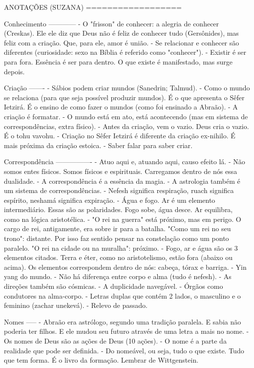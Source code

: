 ANOTAÇÕES (SUZANA)
==================

Conhecimento
------------
- O "frisson" de conhecer: a alegria de conhecer (Creskas). Ele ele diz que Deus não é feliz de conhecer tudo (Gersônides), mas feliz com a criação. Que, para ele, amor é união. 
- Se relacionar e conhecer são diferentes (curiosidade: sexo na Bíblia é referido como "conhecer").
- Existir é ser para fora. Essência é ser para dentro. O que existe é manifestado, mas surge depois.

Criação
-------
- Sábios podem criar mundos (Sanedrin; Talmud).
- Como o mundo se relaciona (para que seja possível produzir mundos). É o que apresenta o Sêfer Ietzirá. É o ensino de como fazer o mundos (como foi ensinado a Abraão).
- A criação é formatar.
- O mundo está em ato, está acontecendo (mas em sistema de correspondências, extra físico).
- Antes da criação, vem o vazio. Deus cria o vazio. É o tohu vavohu. 
- Criação no Sêfer Ietzirá é diferente da criação ex-nihilo. É mais próxima da criação estoica.
- Saber falar para saber criar.

Correspondência
----------------
- Atuo aqui e, atuando aqui, causo efeito lá.
- Não somos entes físicos. Somos físicos e espirituais. Carregamos dentro de nós essa dualidade.
- A correspondência é a essência da magia.
- A astrologia também é um sistema de correspondências.
- Nefesh significa respiração, ruach significa espírito, neshamá significa expiração.
- Água e fogo. Ar é um elemento intermediário. Essas são as polaridades. Fogo sobe, água desce. Ar equilibra, como na lógica aristotélica.
- "O rei na guerra" está próximo, mas em perigo. O cargo de rei, antigamente, era sobre ir para a batalha. "Como um rei no seu trono": distante. Por isso faz sentido pensar na constelação como um ponto paralelo. "O rei na cidade ou na muralha": próximo.
- Fogo, ar e água são os 3 elementos citados. Terra e éter, como no aristotelismo, estão fora (abaixo ou acima). Os elementos correspondem dentro de nós: cabeça, tórax e barriga. 
- Yin yang do mundo.
- Não há diferença entre corpo e alma (tudo é nefesh).
- As direções também são cósmicas.
- A duplicidade navegável.
- Órgãos como condutores na alma-corpo.
- Letras duplas que contém 2 lados, o masculino e o feminino (zachar unekevá).
- Relevo de passado.

Nomes
-----
- Abraão era astrólogo, segundo uma tradição paralela. E sabia não poderia ter filhos. E ele mudou seu futuro através de uma letra a mais no nome.
- Os nomes de Deus são as ações de Deus (10 ações).
- O nome é a parte da realidade que pode ser definida.
- Do nomeável, ou seja, tudo o que existe. Tudo que tem forma. É o livro da formação. Lembrar de Wittgenstein.

